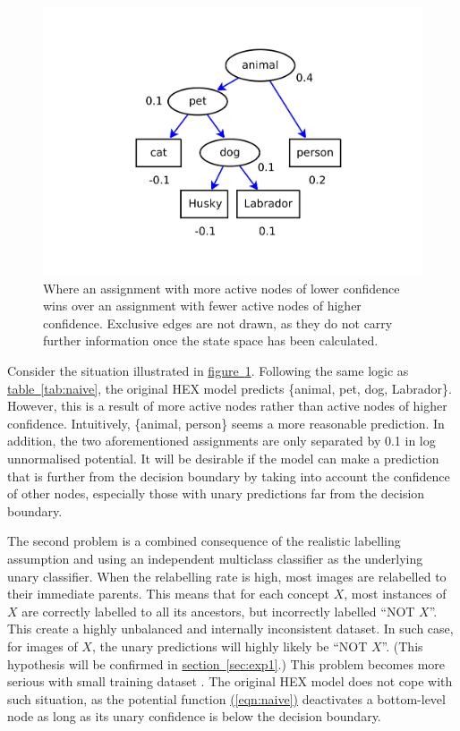 \documentclass[11pt,a4paper]{article}
\begin{document}
\begin{figure}[htbp]
\centering\includegraphics[scale=0.5]{depth.pdf}
\caption{Where an assignment with more active nodes of lower confidence wins over an assignment with fewer active nodes of higher confidence. Exclusive edges are not drawn, as they do not carry further information once the state space has been calculated.}
\label{fig:depth}
\end{figure}

Consider the situation illustrated in \hyperref[fig:depth]{figure~\ref{fig:depth}}. Following the same logic as \hyperref[tab:naive]{table~\ref{tab:naive}}, the original HEX model predicts \{animal, pet, dog, Labrador\}. However, this is a result of more active nodes rather than active nodes of higher confidence. Intuitively, \{animal, person\} seems a more reasonable prediction. In addition, the two aforementioned assignments are only separated by 0.1 in log unnormalised potential. It will be desirable if the model can make a prediction that is further from the decision boundary by taking into account the confidence of other nodes, especially those with unary predictions far from the decision boundary.

The second problem is a combined consequence of the realistic labelling assumption and using an independent multiclass classifier as the underlying unary classifier. When the relabelling rate is high, most images are relabelled to their immediate parents. This means that for each concept $X$, most instances of $X$ are correctly labelled to all its ancestors, but incorrectly labelled ``NOT $X$''. This create a highly unbalanced and internally inconsistent dataset. In such case, for images of $X$, the unary predictions will highly likely be ``NOT $X$''. (This hypothesis will be confirmed in \hyperref[sec:exp1]{section~\ref{sec:exp1}}.) This problem becomes more serious with small training dataset \cite{he2009learning}. The original HEX model does not cope with such situation, as the potential function \hyperref[eqn:naive]{(\ref{eqn:naive})} deactivates a bottom-level node as long as its unary confidence is below the decision boundary.
\end{document}
